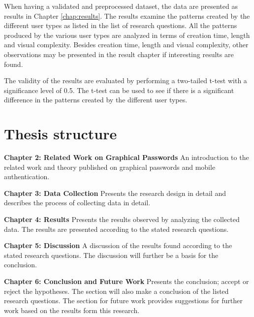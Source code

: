       When having a validated and preprocessed dataset, the data are presented as results in Chapter \ref{chap:results}. The results examine the patterns created by the different user types as listed in the list of research questions. All the patterns produced by the various user types are analyzed in terms of creation time, length and visual complexity. Besides creation time, length and visual complexity, other observations may be presented in the result chapter if interesting results are found. 

      The validity of the results are evaluated by performing a two-tailed t-test with a significance level of 0.5. The t-test can be used to see if there is a significant difference in the patterns created by the different user types.

  \clearpage
  \section{Thesis structure} \label{sec:structure}

    {\bf Chapter 2: Related Work on Graphical Passwords}
    An introduction to the related work and theory published on graphical passwords and mobile authentication.

    {\bf Chapter 3: Data Collection}
    Presents the research design in detail and describes the process of collecting data in detail.

    {\bf Chapter 4: Results}
    Presents the results observed by analyzing the collected data. The results are presented according to the stated research questions.

    {\bf Chapter 5: Discussion}
    A discussion of the results found according to the stated research questions. The discussion will further be a basis for the conclusion. 

    {\bf Chapter 6: Conclusion and Future Work}
    Presents the conclusion; accept or reject the hypotheses. The section will also make a conclusion of the listed research questions. The section for future work provides suggestions for further work based on the results form this research. 
